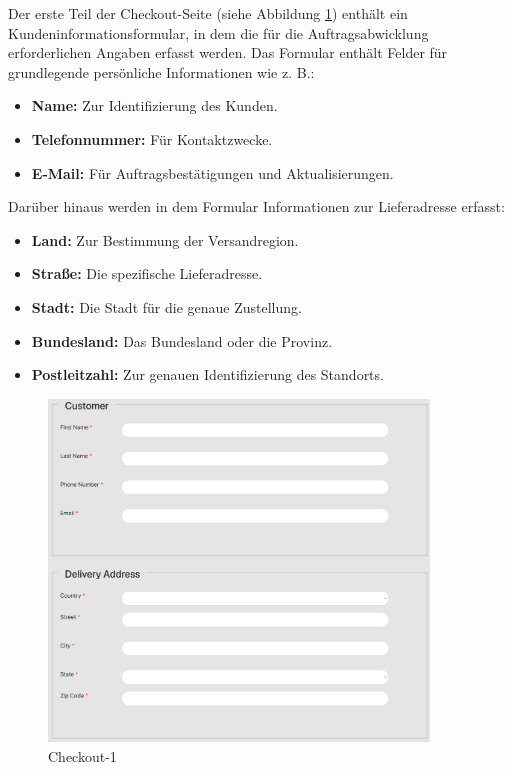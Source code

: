 Der erste Teil der Checkout-Seite (siehe Abbildung \ref{fig:sample3-image}) enthält ein Kundeninformationsformular, in dem die für die Auftragsabwicklung erforderlichen Angaben erfasst werden. Das Formular enthält Felder für grundlegende persönliche Informationen wie z. B.:

\begin{itemize}
	\item \textbf{Name:} Zur Identifizierung des Kunden.
	\item \textbf{Telefonnummer:} Für Kontaktzwecke.
	\item \textbf{E-Mail:} Für Auftragsbestätigungen und Aktualisierungen.
\end{itemize}

Darüber hinaus werden in dem Formular Informationen zur Lieferadresse erfasst:

\begin{itemize}
	\item \textbf{Land:} Zur Bestimmung der Versandregion.
	\item \textbf{Straße:} Die spezifische Lieferadresse.
	\item \textbf{Stadt:} Die Stadt für die genaue Zustellung.
	\item \textbf{Bundesland:} Das Bundesland oder die Provinz.
	\item \textbf{Postleitzahl:} Zur genauen Identifizierung des Standorts.
\end{itemize}

\begin{figure}[H]  
	\centering %
	\includegraphics[width=0.9\textwidth]{Images/Checkout_1.png} 
	\caption{Checkout-1} 
	\label{fig:sample3-image} 
\end{figure}

